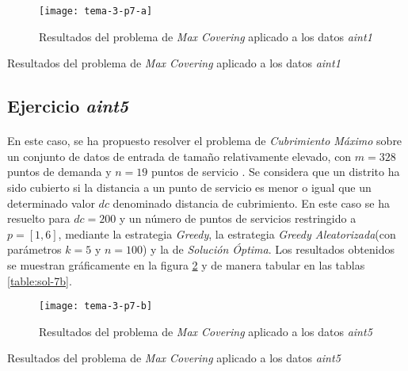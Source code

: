 \documentclass[spanish]{article}
\begin{document}
			\begin{figure}[h]
				\begin{center}
					\texttt{[image: tema-3-p7-a]}
				\end{center}
				\caption{Resultados del problema de \emph{Max Covering} aplicado a los datos \emph{aint1}}
				\label{fig:sol-7a}
			\end{figure}

			\begin{table}[h]
				\begin{center}
				\end{center}
				\caption{Resultados del problema de \emph{Max Covering} aplicado a los datos \emph{aint1}}
				\label{table:sol-7a}
			\end{table}

		\subsection{Ejercicio \emph{aint5}}
		\label{sec:e-7b}

			\paragraph{}
			En este caso, se ha propuesto resolver el problema de \emph{Cubrimiento Máximo} sobre un conjunto de datos de entrada de tamaño relativamente elevado, con $m = 328$ puntos de demanda y $n=19$ puntos de servicio . Se considera que un distrito ha sido cubierto si la distancia a un punto de servicio es menor o igual que un determinado valor $dc$ denominado distancia de cubrimiento. En este caso se ha resuelto para $dc = 200$ y un número de puntos de servicios restringido a $p = [1,6]$, mediante la estrategia \emph{Greedy}, la estrategia \emph{Greedy Aleatorizada}(con parámetros $k=5$ y $n=100$) y la de \emph{Solución Óptima}. Los resultados obtenidos se muestran gráficamente en la figura \ref{fig:sol-7b} y de manera tabular en las tablas \ref{table:sol-7b}.

			\begin{figure}[h]
				\begin{center}
					\texttt{[image: tema-3-p7-b]}
				\end{center}
				\caption{Resultados del problema de \emph{Max Covering} aplicado a los datos \emph{aint5}}
				\label{fig:sol-7b}
			\end{figure}

			\begin{table}[h]
				\begin{center}
				\end{center}
				\caption{Resultados del problema de \emph{Max Covering} aplicado a los datos \emph{aint5}}
				\label{table:sol-7b}
			\end{table}
\end{document}
